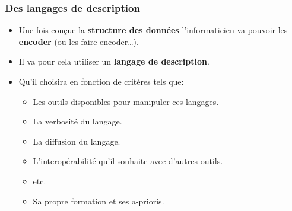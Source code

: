 \subsubsection{Des langages de description}

\begin{slide}
	\begin{itemize}
		\item Une fois conçue la \textbf{structure des données} l'informaticien va pouvoir les \textbf{encoder} (ou les faire encoder…).
		\item Il va pour cela utiliser un \textbf{langage de description}.
		\item Qu'il choisira en fonction de critères tels que:
			\begin{itemize}
				\item Les outils disponibles pour manipuler ces langages.
				\item La verbosité du langage.
				\item La diffusion du langage.
				\item L'interopérabilité qu'il souhaite avec d'autres outils.
				\item etc.
				\item Sa propre formation et ses a-prioris.
			\end{itemize}
	\end{itemize}
\end{slide}

\begin{slide}

		\beamerdefaultoverlayspecification{}

		
	
		
\end{slide}

